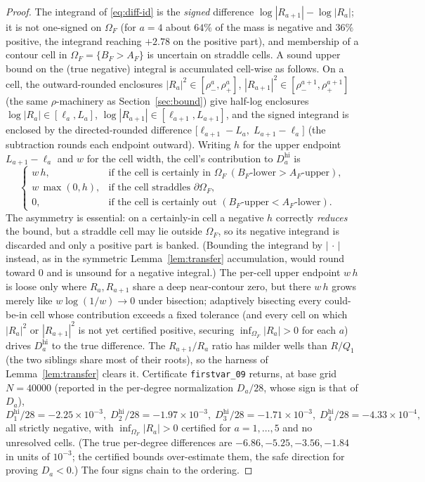 \documentclass[11pt,reqno]{amsart}
\theoremstyle{plain}
\theoremstyle{definition}
\begin{document}
\begin{proof}
The integrand of \eqref{eq:diff-id} is the \emph{signed} difference
$\log|R_{a+1}|-\log|R_a|$; it is not one-signed on $\Omega_F$ (for $a=4$ about $64\%$ of
the mass is negative and $36\%$ positive, the integrand reaching $+2.78$ on the
positive part), and
membership of a contour cell in $\Omega_F=\{B_F>A_F\}$ is uncertain on straddle cells.
A sound upper bound on the (true negative) integral is accumulated cell-wise as
follows. On a cell, the outward-rounded enclosures $|R_a|^2\in[\rho^a_-,\rho^a_+]$,
$|R_{a+1}|^2\in[\rho^{a+1}_-,\rho^{a+1}_+]$ (the same $\rho$-machinery as
Section~\ref{sec:bound}) give half-log enclosures $\log|R_a|\in[\ell_a,L_a]$,
$\log|R_{a+1}|\in[\ell_{a+1},L_{a+1}]$, and the signed integrand is enclosed by the
directed-rounded difference $\bigl[\ell_{a+1}-L_a,\;L_{a+1}-\ell_a\bigr]$ (the
subtraction rounds each endpoint outward). Writing $h$ for the upper endpoint
$L_{a+1}-\ell_a$ and $w$ for the cell width, the cell's contribution to
$D_a^{\mathrm{hi}}$ is
\[
  \begin{cases}
    w\,h, & \text{if the cell is certainly in } \Omega_F\ (B_F\text{-lower}>A_F\text{-upper}),\\[2pt]
    w\,\max(0,h), & \text{if the cell straddles } \partial\Omega_F,\\[2pt]
    0, & \text{if the cell is certainly out } (B_F\text{-upper}<A_F\text{-lower}).
  \end{cases}
\]
The asymmetry is essential: on a certainly-in cell a negative $h$ correctly
\emph{reduces} the bound, but a straddle cell may lie outside $\Omega_F$, so its
negative integrand is discarded and only a positive part is banked. (Bounding the
integrand by $|\,\cdot\,|$ instead, as in the symmetric Lemma~\ref{lem:transfer}
accumulation, would round toward $0$ and is unsound for a negative integral.) The
per-cell upper endpoint $w\,h$ is loose only where $R_a,R_{a+1}$ share a deep
near-contour zero, but there $w\,h$ grows merely like $w\log(1/w)\to0$ under bisection;
adaptively bisecting every could-be-in cell whose contribution exceeds a fixed
tolerance (and every cell on which $|R_a|^2$ or $|R_{a+1}|^2$ is not yet certified
positive, securing $\inf_{\Omega_F}|R_a|>0$ for each $a$) drives $D_a^{\mathrm{hi}}$ to
the true difference. The $R_{a+1}/R_a$ ratio has milder wells than $R/Q_1$ (the two
siblings share most of their roots), so the harness of Lemma~\ref{lem:transfer} clears
it. Certificate \texttt{firstvar\_09} returns, at base grid $N=40000$ (reported in the
per-degree normalization $D_a/28$, whose sign is that of $D_a$),
\[
  D_1^{\mathrm{hi}}/28=-2.25\times10^{-3},\;
  D_2^{\mathrm{hi}}/28=-1.97\times10^{-3},\;
  D_3^{\mathrm{hi}}/28=-1.71\times10^{-3},\;
  D_4^{\mathrm{hi}}/28=-4.33\times10^{-4},
\]
all strictly negative, with $\inf_{\Omega_F}|R_a|>0$ certified for $a=1,\dots,5$ and no
unresolved cells. (The true per-degree differences are $-6.86,-5.25,-3.56,-1.84$ in
units of $10^{-3}$; the certified bounds over-estimate them, the safe direction for
proving $D_a<0$.) The four signs chain to the ordering.
\end{proof}
\end{document}
